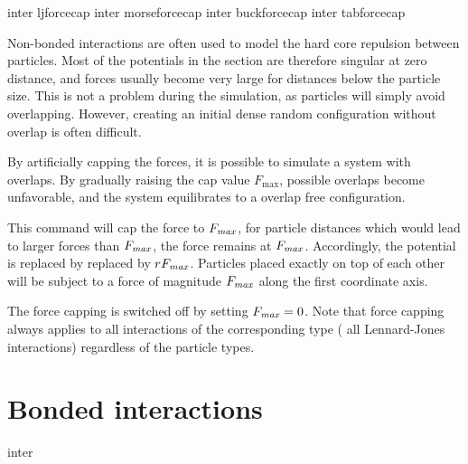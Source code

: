 \begin{essyntax}
   inter ljforcecap    
   inter morseforcecap 
   inter buckforcecap  
   inter tabforcecap   
  \begin{features}
  \end{features}  
\end{essyntax}

Non-bonded interactions are often used to model the hard core repulsion between
particles. Most of the potentials in the section are therefore singular at zero
distance, and forces usually become very large for distances below the particle
size. This is not a problem during the simulation, as particles will simply
avoid overlapping. However, creating an initial dense random configuration
without overlap is often difficult.

By artificially capping the forces, it is possible to simulate a system with
overlaps. By gradually raising the cap value $F_\text{max}$, possible overlaps
become unfavorable, and the system equilibrates to a overlap free configuration.

This command will cap the force to $F_\text{\mbox{\textrm{\textit{max}}}}$, \ie for particle
distances which would lead to larger forces than $F_\text{\mbox{\textrm{\textit{max}}}}$, the force
remains at $F_\text{\mbox{\textrm{\textit{max}}}}$. Accordingly, the potential is replaced by
replaced by $r F_\text{\mbox{\textrm{\textit{max}}}}$. Particles placed exactly on top of each other
will be subject to a force of magnitude $F_\text{\mbox{\textrm{\textit{max}}}}$ along the first
coordinate axis.

The force capping is switched off by setting $F_\text{\mbox{\textrm{\textit{max}}}}=0$. Note that
force capping always applies to all interactions of the corresponding type (\eg
all Lennard-Jones interactions) regardless of the particle types.

\section{Bonded interactions}
\label{sec:inter-bonded}

\begin{essyntax}
  inter 
\end{essyntax}

